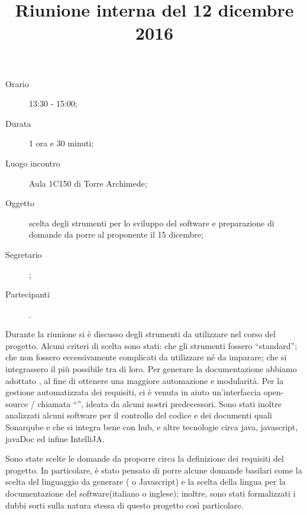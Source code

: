 


\author{\PB}
\supervisor{\MM}
\title{Riunione interna del 12 dicembre 2016}



\maketitle

\begin{description}
	\item[Orario] 13:30 - 15:00;
	\item[Durata] 1 ora e 30 minuti;
	\item[Luogo incontro] Aula 1C150 di Torre Archimede;
	\item[Oggetto] scelta degli strumenti per lo sviluppo del software e preparazione di domande da porre al proponente il 15 dicembre;
	\item[Segretario] \PB; 
	\item[Partecipanti] \ALL.
\end{description}

Durante la riunione si è discusso degli strumenti da utilizzare nel corso del progetto. Alcuni criteri di scelta sono stati: che gli strumenti fossero “standard”; che non fossero eccessivamente complicati da utilizzare né da imparare; che si integrassero il più possibile tra di loro. Per generare la documentazione abbiamo adottato , al fine di ottenere una maggiore automazione e modularità. Per la gestione automatizzata dei requisiti, ci è venuta in aiuto un'interfaccia open-source / chiamata “”, ideata da alcuni nostri predecessori. Sono stati inoltre analizzati alcuni software per il controllo del codice e dei documenti quali Sonarqube e  che si integra bene con hub, e altre tecnologie circa java, javascript, javaDoc ed infine IntelliJA.

Sono state scelte le domande da proporre circa la definizione dei requisiti del progetto. In particolare, è stato pensato di porre alcune domande basilari come la scelta del linguaggio da generare ( o Javascript) e la scelta della lingua per la documentazione del software(italiano o inglese); inoltre, sono stati formalizzati i dubbi sorti sulla natura stessa di questo progetto così particolare.


